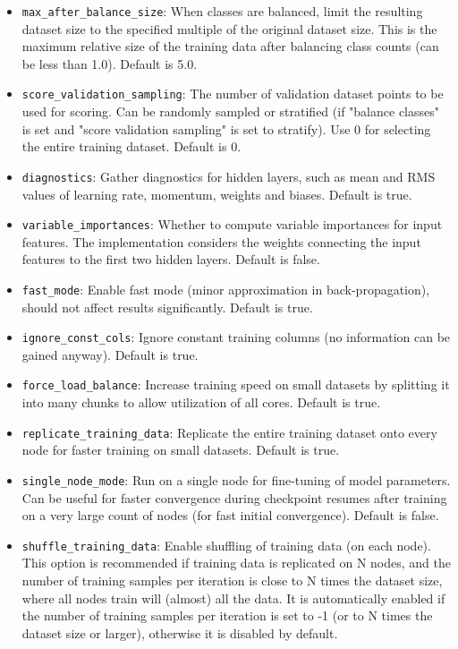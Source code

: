 \documentclass[11pt]{article}
\begin{document}
\begin{itemize}
\item \texttt{max\_after\_balance\_size}: When classes are balanced, limit the resulting dataset size to the specified multiple of the original dataset size. This is the maximum relative size of the training data after balancing class counts (can be less than 1.0). Default is 5.0.
\item \texttt{score\_validation\_sampling}: The number of validation dataset points to be used for scoring. Can be randomly sampled or stratified (if "balance classes" is set and "score validation sampling" is set to stratify). Use 0 for selecting the entire training dataset. Default is 0.
\item \texttt{diagnostics}: Gather diagnostics for hidden layers, such as mean and RMS values of learning rate, momentum, weights and biases. Default is true.
\item \texttt{variable\_importances}: Whether to compute variable importances for input features. The implementation considers the weights connecting the input features to the first two hidden layers. Default is false.
\item \texttt{fast\_mode}: Enable fast mode (minor approximation in back-propagation), should not affect results significantly. Default is true.
\item \texttt{ignore\_const\_cols}: Ignore constant training columns (no information can be gained anyway). Default is true.
\item \texttt{force\_load\_balance}:  Increase training speed on small datasets by splitting it into many chunks to allow utilization of all cores. Default is true.
\item \texttt{replicate\_training\_data}:  Replicate the entire training dataset onto every node for faster training on small datasets. Default is true.
\item \texttt{single\_node\_mode}:  Run on a single node for fine-tuning of model parameters. Can be useful for faster convergence during checkpoint resumes after training on a very large count of nodes (for fast initial convergence). Default is false.
\item \texttt{shuffle\_training\_data}: Enable shuffling of training data (on each node). This option is recommended if training data is replicated on N nodes, and the number of training samples per iteration is close to N times the dataset size, where all nodes train will (almost) all the data. It is automatically enabled if the number of training samples per iteration is set to -1 (or to N times the dataset size or larger), otherwise it is disabled by default.
\end{itemize}
\end{document}
